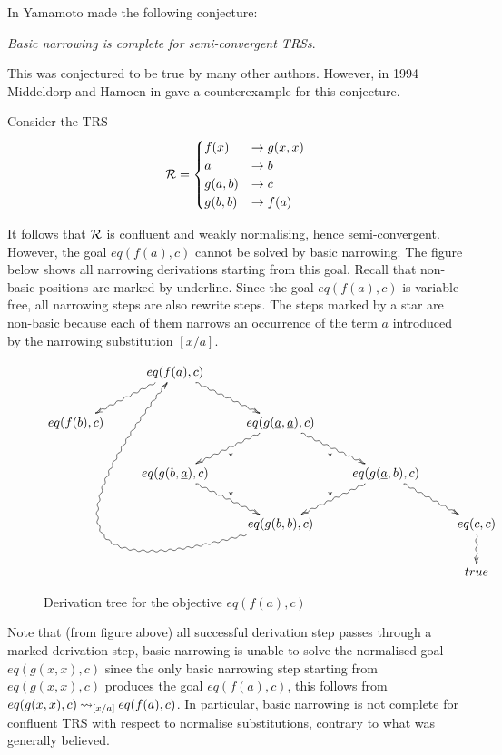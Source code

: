 In \cite{10.1007/3-540-51564-X_51} Yamamoto made the following conjecture:
\begin{center}
    \textit{Basic narrowing is complete for semi-convergent TRSs}.
\end{center}
This was conjectured to be true by many other authors. However, in 1994 Middeldorp and Hamoen in \cite{Middeldorp1994} gave a counterexample for this conjecture.

Consider the TRS
\begin{displaymath}
    \mathcal{R} =
	\begin{cases}
		f(x) & \rightarrow g(x,x)                               \\
        a & \rightarrow b \\
        g(a,b) & \rightarrow c \\
        g(b,b) & \rightarrow f(a)
	\end{cases}
\end{displaymath}

It follows that $\mathcal{R}$ is confluent and weakly normalising, hence semi-convergent. However, the goal $eq(f(a),c)$ cannot be solved by basic narrowing. The figure below shows all narrowing derivations starting from this goal. Recall that non-basic positions are marked by underline. Since the goal $eq(f(a),c)$ is variable-free, all narrowing steps are also rewrite steps. The steps marked by a star are non-basic because each of them narrows an occurrence of the term $a$ introduced by the narrowing substitution $[x / a]$.
\begin{figure}[!ht]
    \begin{displaymath}
        \xymatrix{
            & eq(f(a),c)\ar@{~>}[dr] \ar@{~>}[dl] &  &  &  \\
            eq(f(b),c) &  & eq(g(\underline{a},\underline{a}), c) \ar@{~>}[dl]^{\star} \ar@{~>}[dr]_{\star} &  & \\
            & eq(g(b,\underline{a}),c) \ar@{~>}[dr]^{\star} & & eq(g(\underline{a},b),c) \ar@{~>}[dl]_{\star} \ar@{~>}[dr] &\\
            & & eq(g(b,b),c) \ar@{~>}@/^10pc/[lluuur] & & eq(c,c) \ar@{~>}[d]\\
            & &  & & true
        }
    \end{displaymath}
    \caption{Derivation tree for the objective $eq(f(a),c)$}
    \label{figure:counterexample}
\end{figure}

Note that (from figure above) all successful derivation step passes through a marked derivation step, basic narrowing is unable to solve the normalised goal $eq(g(x,x),c)$ since the only basic narrowing step starting from $eq(g(x,x),c)$ produces the goal $eq(f(a),c)$, this follows from  $eq(g(x,x),c) \mathbin{\rightsquigarrow}_{[x/a]} eq(f(a),c)$. In particular, basic narrowing is not complete for confluent TRS with respect to normalise substitutions, contrary to what was generally believed.
